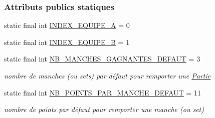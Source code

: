 \subsubsection*{Attributs publics statiques}
\begin{DoxyCompactItemize}
\item 
static final int \hyperlink{classcom_1_1example_1_1area_1_1_rencontre_a673930c3156037739c3fa2aa335033d7}{I\+N\+D\+E\+X\+\_\+\+E\+Q\+U\+I\+P\+E\+\_\+A} = 0
\item 
static final int \hyperlink{classcom_1_1example_1_1area_1_1_rencontre_a08ed5cef8f2bbb80b2010bdb60c515d6}{I\+N\+D\+E\+X\+\_\+\+E\+Q\+U\+I\+P\+E\+\_\+B} = 1
\item 
static final int \hyperlink{classcom_1_1example_1_1area_1_1_rencontre_a9ab6dcd72bcb2ca3c21ed3fcba4a9b46}{N\+B\+\_\+\+M\+A\+N\+C\+H\+E\+S\+\_\+\+G\+A\+G\+N\+A\+N\+T\+E\+S\+\_\+\+D\+E\+F\+A\+UT} = 3
\begin{DoxyCompactList}\small\item\em nombre de manches (ou sets) par défaut pour remporter une \hyperlink{classcom_1_1example_1_1area_1_1_partie}{Partie} \end{DoxyCompactList}\item 
static final int \hyperlink{classcom_1_1example_1_1area_1_1_rencontre_ac2217d1cf2cf9310966619ba69214259}{N\+B\+\_\+\+P\+O\+I\+N\+T\+S\+\_\+\+P\+A\+R\+\_\+\+M\+A\+N\+C\+H\+E\+\_\+\+D\+E\+F\+A\+UT} = 11
\begin{DoxyCompactList}\small\item\em nombre de points par défaut pour remporter une manche (ou set) \end{DoxyCompactList}\end{DoxyCompactItemize}
